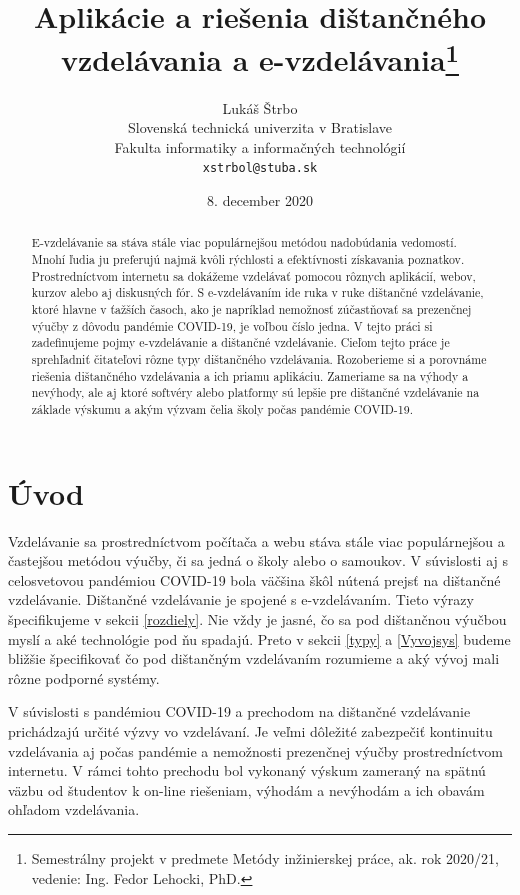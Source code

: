 \documentclass[10pt,oneside,slovak,a4paper]{article}
\title{Aplikácie a riešenia dištančného vzdelávania a e-vzdelávania\thanks{Semestrálny projekt v predmete Metódy inžinierskej práce, ak. rok 2020/21, vedenie: Ing. Fedor Lehocki, PhD.}}
\author{Lukáš Štrbo\\[2pt]
	{\small Slovenská technická univerzita v Bratislave}\\
	{\small Fakulta informatiky a informačných technológií}\\
	{\small \texttt{xstrbol@stuba.sk}}
	}
\date{\small 8. december 2020}
\begin{document}
\maketitle

\begin{abstract}
E-vzdelávanie sa stáva stále viac populárnejšou metódou nadobúdania vedomostí. Mnohí ľudia ju preferujú najmä kvôli rýchlosti a efektívnosti získavania poznatkov.
Prostredníctvom internetu sa dokážeme vzdelávať pomocou rôznych aplikácií, webov, kurzov alebo aj diskusných fór.
S e-vzdelávaním ide ruka v ruke dištančné vzdelávanie, ktoré hlavne v ťažších časoch, ako je napríklad nemožnosť zúčastňovať sa prezenčnej výučby z dôvodu pandémie COVID-19, 
 je voľbou číslo jedna. V tejto práci si zadefinujeme pojmy e-vzdelávanie a dištančné vzdelávanie. Cieľom tejto práce je sprehľadniť čitateľovi rôzne typy dištančného vzdelávania. Rozoberieme si a porovnáme riešenia dištančného vzdelávania a ich priamu
 aplikáciu. Zameriame sa na výhody a nevýhody, ale aj ktoré softvéry alebo platformy sú lepšie pre dištančné vzdelávanie na základe výskumu a akým výzvam čelia školy počas pandémie COVID-19.
\end{abstract}


\section*{Úvod} %
\label{uvod}
Vzdelávanie sa prostredníctvom počítača a webu stáva stále viac populárnejšou a častejšou metódou výučby, či sa jedná o školy alebo o samoukov. V súvislosti aj s celosvetovou pandémiou 
 COVID-19 bola väčšina škôl nútená prejsť na dištančné vzdelávanie. Dištančné vzdelávanie je spojené s e-vzdelávaním. Tieto výrazy špecifikujeme v sekcii \ref{rozdiely}.  
 Nie vždy je jasné, čo sa pod dištančnou výučbou myslí a aké technológie pod ňu spadajú. Preto v sekcii \ref{typy} a \ref{Vyvojsys} budeme bližšie špecifikovať čo pod dištančným vzdelávaním rozumieme a aký vývoj mali rôzne podporné systémy.
 
 V súvislosti s pandémiou COVID-19 a prechodom na dištančné vzdelávanie prichádzajú určité výzvy vo vzdelávaní.
 Je veľmi dôležité zabezpečiť kontinuitu vzdelávania aj počas pandémie a nemožnosti prezenčnej výučby prostredníctvom internetu. V rámci tohto prechodu bol vykonaný výskum zameraný na spätnú väzbu od študentov k on-line riešeniam, výhodám a nevýhodám a ich obavám ohľadom vzdelávania.
\end{document}
